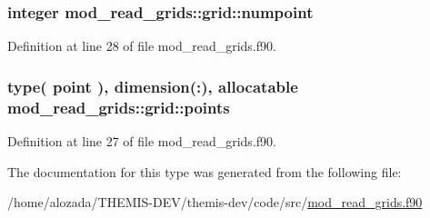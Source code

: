 \subsubsection[{\texorpdfstring{numpoint}{numpoint}}]{\setlength{\rightskip}{0pt plus 5cm}integer mod\+\_\+read\+\_\+grids\+::grid\+::numpoint}\hypertarget{structmod__read__grids_1_1grid_a71e57f105913758d04222ff4a0a33c5e}{}\label{structmod__read__grids_1_1grid_a71e57f105913758d04222ff4a0a33c5e}


Definition at line 28 of file mod\+\_\+read\+\_\+grids.\+f90.

\subsubsection[{\texorpdfstring{points}{points}}]{\setlength{\rightskip}{0pt plus 5cm}type( {\bf point} ), dimension(\+:), allocatable mod\+\_\+read\+\_\+grids\+::grid\+::points}\hypertarget{structmod__read__grids_1_1grid_aa276c61a9bfda811d98102170e4bfeaf}{}\label{structmod__read__grids_1_1grid_aa276c61a9bfda811d98102170e4bfeaf}


Definition at line 27 of file mod\+\_\+read\+\_\+grids.\+f90.



The documentation for this type was generated from the following file\+:\begin{DoxyCompactItemize}
\item 
/home/alozada/\+T\+H\+E\+M\+I\+S-\/\+D\+E\+V/themis-\/dev/code/src/\hyperlink{mod__read__grids_8f90}{mod\+\_\+read\+\_\+grids.\+f90}\end{DoxyCompactItemize}
